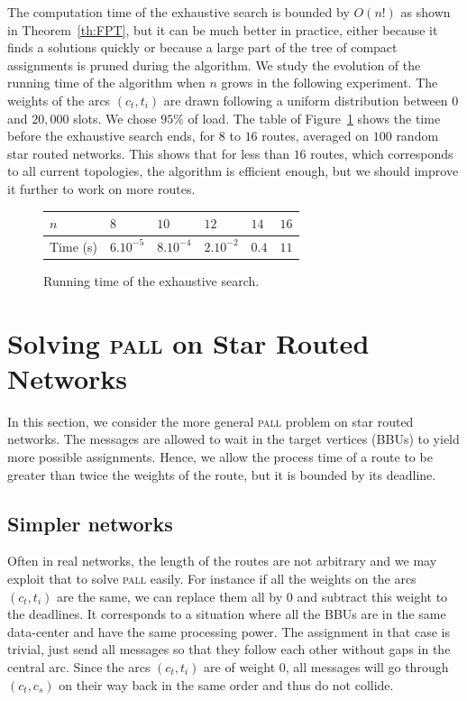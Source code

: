 \documentclass[10pt, conference, letterpaper]{IEEEtran}
\newcommand\pall{\textsc{pall}\xspace}
\begin{document}
      The computation time of the exhaustive search is bounded by $O(n!)$ as shown in Theorem~\ref{th:FPT}, 
      but it can be much better in practice, either because it finds a solutions quickly or because a large part of the tree of 
      compact assignments is pruned during the algorithm. We study the evolution of the running time  of the algorithm when $n$ grows in the following experiment. The weights of the arcs $(c_t,t_i)$ are drawn following a uniform distribution between $0$ and $20,000$ slots. We chose  $95\%$ of load.  The table of Figure~\ref{fig:table} shows the time before the exhaustive search ends, for $8$ to $16$ routes, averaged on $100$ random star routed networks. This shows that for less than $16$ routes, which corresponds to all current topologies, the algorithm is efficient enough, but we should improve it further to work on more routes.
      
      \begin{figure}[h]
         \begin{center}
         \begin{tabularx}{0.5\textwidth}{|l|X|X|X|X|X|}
    \hline
   $n$ & $8$ & $10$& $12$&$14$& $16$\\
    \hline
   Time (s) & $6.10^{-5}$&$8.10^{-4}$&$2.10^{-2}$& $0.4$& $11$\\
    \hline
      \end{tabularx}
      \end{center}
      \caption{Running time of the exhaustive search.}
      \label{fig:table}
      \end{figure}
      
         \section{Solving \pall on Star Routed Networks}\label{sec:PALL}
    
    In this section, we consider the more general \pall problem on star routed networks. The messages are allowed to wait in the target vertices (BBUs) to yield more possible assignments. Hence, we allow the process time of a route to be greater than twice the weights of the route, but it is bounded by its deadline.

	\subsection{Simpler networks}
		
		
	Often in real networks, the length of the routes are not arbitrary and we may exploit that to solve \pall easily. For instance if all the weights on the arcs $(c_t,t_i)$ are the same, we can replace them all by $0$ and subtract this weight to the deadlines. It corresponds to a situation where all the BBUs are in the same data-center and have the same processing power. The assignment in that case is trivial, just send all messages so that they follow each other without gaps in the central arc. Since the arcs $(c_t,t_i)$ are of weight $0$, all messages will go through $(c_t,c_s)$ on their way back in the same order and thus do not collide. 
	
\end{document}
